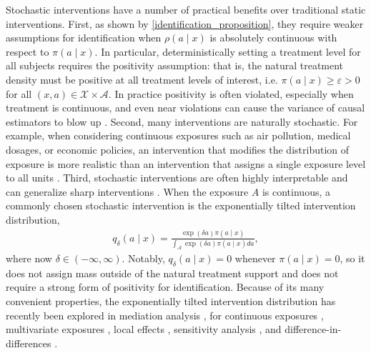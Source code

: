 \documentclass[11pt,twoside]{article}
\theoremstyle{definition}
\theoremstyle{remark}
\begin{document}
Stochastic interventions have a number of practical benefits over traditional static interventions. First, as shown by \cref{identification_proposition}, they require weaker assumptions for identification when $\rho(a \! \mid \! x)$ is absolutely continuous with respect to $\pi(a \! \mid \! x)$. In particular, deterministically setting a treatment level for all subjects requires the positivity assumption: that is, the natural treatment density must be positive at all treatment levels of interest, i.e. $\pi(a \! \mid \! x)  \geq \varepsilon > 0$ for all $(x, a) \in \mathcal{X} \times \mathcal{A}$. In practice positivity is often violated, especially when treatment is continuous, and even near violations can cause the variance of causal estimators to blow up \citep{busso2014new, branson2023causal}. Second, many interventions are naturally stochastic. For example, when considering continuous exposures such as air pollution, medical dosages, or economic policies, an intervention that modifies the distribution of exposure is more realistic than an intervention that assigns a single exposure level to all units \citep{Diaz03042023, huang2026multivariateincrementaleffectscontinuous}. Third, stochastic interventions are often highly interpretable and can generalize sharp interventions \citep{kennedy2019nonparametric}. When the exposure $A$ is continuous, a commonly chosen stochastic intervention is the exponentially tilted intervention distribution,
\begin{align} \label{exponential_tilt_def}
    q_\delta(a \! \mid \! x) = \frac{\exp(\delta a) \pi(a \! \mid \! x)}{\int_\mathcal{A} \exp(\delta a) \pi(a \! \mid \! x) da},
\end{align}
where now $\delta \in (-\infty, \infty)$. Notably, $q_\delta(a \! \mid \! x) = 0$ whenever $\pi(a \! \mid \! x) = 0$, so it does not assign mass outside of the natural treatment support and does not require a strong form of positivity for identification. Because of its many convenient properties, the exponentially tilted intervention distribution has recently been explored in mediation analysis \citep{diaz2020causal}, for continuous exposures \citep{schindl2024incremental}, multivariate exposures \citep{huang2026multivariateincrementaleffectscontinuous}, local effects \citep{rakshit2024localeffectscontinuousinstruments}, sensitivity analysis \citep{levis2024stochastic}, and difference-in-differences \citep{jetsupphasuk2026differenceindifferencesstochasticpolicyshifts}. 
\end{document}
